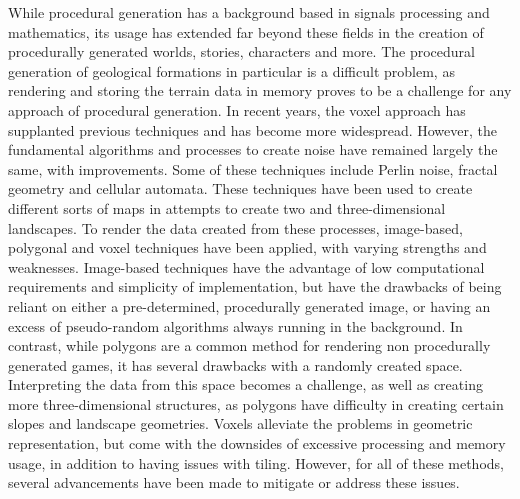 \documentclass[10pt]{report}
\begin{document}
		While procedural generation has a background based in signals processing and mathematics, its usage has extended far beyond these fields in the creation of procedurally generated worlds, stories, characters and more. The procedural generation of geological formations in particular is a difficult problem, as rendering and storing the terrain data in memory proves to be a challenge for any approach of procedural generation. In recent years, the voxel approach has supplanted previous techniques and has become more widespread. However, the fundamental algorithms and processes to create noise have remained largely the same, with improvements. Some of these techniques include Perlin noise, fractal geometry and cellular automata. These techniques have been used to create different sorts of maps in attempts to create two and three-dimensional landscapes. To render the data created from these processes, image-based, polygonal and voxel techniques have been applied, with varying strengths and weaknesses. Image-based techniques have the advantage of low computational requirements and simplicity of implementation, but have the drawbacks of being reliant on either a pre-determined, procedurally generated image, or having an excess of pseudo-random algorithms always running in the background. In contrast, while polygons are a common method for rendering non procedurally generated games, it has several drawbacks with a randomly created space. Interpreting the data from this space becomes a challenge, as well as creating more three-dimensional structures, as polygons have difficulty in creating certain slopes and landscape geometries. Voxels alleviate the problems in geometric representation, but come with the downsides of excessive processing and memory usage, in addition to having issues with tiling. However, for all of these methods, several advancements have been made to mitigate or address these issues. 
	
	\newpage
	\renewcommand{\bibname}{References}
	
		
\end{document}
